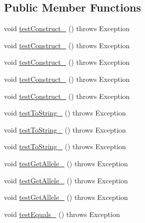 \subsection*{Public Member Functions}
\begin{DoxyCompactItemize}
\item 
void \hyperlink{classorg_1_1jgap_1_1impl_1_1_boolean_gene_test_a763d1230d69ce26ecc446b199d4ffe35}{test\-Construct\-\_} ()  throws Exception 
\item 
void \hyperlink{classorg_1_1jgap_1_1impl_1_1_boolean_gene_test_a627656b864f7943cd3d88e41a391b7bf}{test\-Construct\-\_} ()  throws Exception 
\item 
void \hyperlink{classorg_1_1jgap_1_1impl_1_1_boolean_gene_test_ab1feba7162434b8a9e36b007930cf207}{test\-Construct\-\_} ()  throws Exception 
\item 
void \hyperlink{classorg_1_1jgap_1_1impl_1_1_boolean_gene_test_a91475bbef8836615c2ecc95169dceefd}{test\-Construct\-\_} ()  throws Exception 
\item 
void \hyperlink{classorg_1_1jgap_1_1impl_1_1_boolean_gene_test_a692ebd48a4e1b711ce08d4c172c8a89c}{test\-Construct\-\_} ()  throws Exception 
\item 
void \hyperlink{classorg_1_1jgap_1_1impl_1_1_boolean_gene_test_a708b0ca8dd431e60c9fb8f4e7089d98b}{test\-To\-String\-\_} ()  throws Exception 
\item 
void \hyperlink{classorg_1_1jgap_1_1impl_1_1_boolean_gene_test_aab652f751096e101f59aa22cc82ae1c5}{test\-To\-String\-\_} ()  throws Exception 
\item 
void \hyperlink{classorg_1_1jgap_1_1impl_1_1_boolean_gene_test_a88ca0d100fe9f39ccac97a2300aaf8b9}{test\-To\-String\-\_} ()  throws Exception 
\item 
void \hyperlink{classorg_1_1jgap_1_1impl_1_1_boolean_gene_test_a2a18abbcac317647e28ab483a35ee5e5}{test\-Get\-Allele\-\_} ()  throws Exception 
\item 
void \hyperlink{classorg_1_1jgap_1_1impl_1_1_boolean_gene_test_a7fdd00cd59d8c55f62b38ff3d275d85a}{test\-Get\-Allele\-\_} ()  throws Exception 
\item 
void \hyperlink{classorg_1_1jgap_1_1impl_1_1_boolean_gene_test_a6090cadbb461f80f900f5dd1635e12fb}{test\-Get\-Allele\-\_} ()  throws Exception 
\item 
void \hyperlink{classorg_1_1jgap_1_1impl_1_1_boolean_gene_test_a7e7df65f53982631f1787bab433b5522}{test\-Equals\-\_} ()  throws Exception 
\item 

\end{DoxyCompactItemize}
